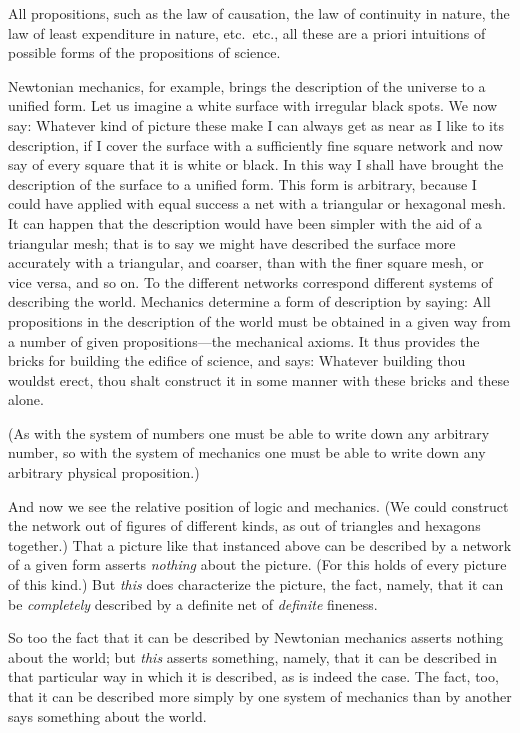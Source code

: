 {All propositions, such as the law of causation,
the law of continuity in nature, the law of least
expenditure in nature, etc.\ etc., all these are
a priori intuitions of possible forms of the propositions
of science.}


{Newtonian mechanics, for example, brings the
description of the universe to a unified form.
Let us imagine a white surface with irregular
black spots. We now say: Whatever kind of
picture these make I can always get as near as
I like to its description, if I cover the surface
with a sufficiently fine square network and now
say of every square that it is white or black.
In this way I shall have brought the description
of the surface to a unified form. This form is
arbitrary, because I could have applied with equal
success a net with a triangular or hexagonal
mesh. It can happen that the description would
have been simpler with the aid of a triangular
mesh; that is to say we might have described
the surface more accurately with a triangular,
and coarser, than with the finer square mesh, or
vice versa, and so on. To the different networks
correspond different systems of describing the
world. Mechanics determine a form of description
by saying: All propositions in the description
of the world must be obtained in a given
way from a number of given propositions---the
mechanical axioms. It thus provides the bricks
for building the edifice of science, and says:
Whatever building thou wouldst erect, thou shalt
construct it in some manner with these bricks
and these alone.

(As with the system of numbers one must be
able to write down any arbitrary number, so
with the system of mechanics one must be able
to write down any arbitrary physical proposition.)}


{And now we see the relative position of logic
and mechanics. (We could construct the network
out of figures of different kinds, as out of
triangles and hexagons together.) That a picture
like that instanced above can be described by a
network of a given form asserts \emph{nothing} about
the picture. (For this holds of every picture of
this kind.) But \emph{this} does characterize the picture,
the fact, namely, that it can be \emph{completely} described
by a definite net of \emph{definite} fineness.

So too the fact that it can be described by
Newtonian mechanics asserts nothing about the
world; but \emph{this} asserts something, namely, that
it can be described in that particular way in which
it is described, as is indeed the case. The fact,
too, that it can be described more simply by one
system of mechanics than by another says something
about the world.}


